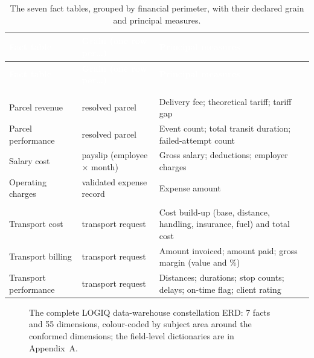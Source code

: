\begingroup
\renewcommand{\arraystretch}{1.3}
\begin{xltabular}{\linewidth}{|>{\raggedright\arraybackslash}p{3.3cm}|>{\raggedright\arraybackslash}p{3.6cm}|>{\raggedright\arraybackslash}X|}
\caption{The seven fact tables, grouped by financial perimeter, with their declared grain and principal
measures.}
\label{tab:ch4-dw-facts} \\
\hline
{}
\textcolor{white}{\textbf{Fact table}} & \textcolor{white}{\textbf{Grain (one row per\dots)}} &
\textcolor{white}{\textbf{Principal measures}} \\
\hline
\endfirsthead
\hline
{}
\textcolor{white}{\textbf{Fact table}} & \textcolor{white}{\textbf{Grain (one row per\dots)}} &
\textcolor{white}{\textbf{Principal measures}} \\
\hline
\endhead
\hline
{} \\
\endfoot
\endlastfoot
{} \\
\hline
Parcel revenue & resolved parcel & Delivery fee; theoretical tariff; tariff gap \\
Parcel performance & resolved parcel & Event count; total transit duration; failed-attempt count \\
Salary cost & payslip (employee $\times$ month) & Gross salary; deductions; employer charges \\
Operating charges & validated expense record & Expense amount \\
\hline
{} \\
\hline
Transport cost & transport request & Cost build-up (base, distance, handling, insurance, fuel) and
total cost \\
Transport billing & transport request & Amount invoiced; amount paid; gross margin (value and \%) \\
Transport performance & transport request & Distances; durations; stop counts; delays; on-time flag;
client rating \\
\hline
\end{xltabular}
\endgroup

\begin{landscape}
\thispagestyle{empty}
\begin{figure}[p]
\centering

\caption{The complete LOGIQ data-warehouse constellation ERD: 7 facts and 55 dimensions, colour-coded
by subject area around the conformed dimensions; the field-level dictionaries are in Appendix~A.}
\label{fig:ch4-dw-erd}
\end{figure}
\end{landscape}

